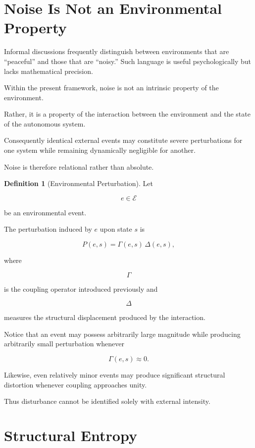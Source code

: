 \documentclass[11pt,oneside]{book}
\numberwithin{equation}{chapter}
\theoremstyle{definition}
\newtheorem{definition}{Definition}[chapter]
\theoremstyle{plain}
\begin{document}
\section{Noise Is Not an Environmental Property}

Informal discussions frequently distinguish between environments that are
``peaceful'' and those that are ``noisy.'' Such language is useful
psychologically but lacks mathematical precision.

Within the present framework, noise is not an intrinsic property of the
environment.

Rather, it is a property of the interaction between the environment and the
state of the autonomous system.

Consequently identical external events may constitute severe perturbations
for one system while remaining dynamically negligible for another.

Noise is therefore relational rather than absolute.

\begin{definition}[Environmental Perturbation]

Let

\[
e\in\mathcal{E}
\]

be an environmental event.

The perturbation induced by $e$ upon state $s$ is

\[
P(e,s)
=
\Gamma(e,s)\,
\Delta(e,s),
\]

where

\[
\Gamma
\]

is the coupling operator introduced previously and

\[
\Delta
\]

measures the structural displacement produced by the interaction.

\end{definition}

Notice that an event may possess arbitrarily large magnitude while producing
arbitrarily small perturbation whenever

\[
\Gamma(e,s)\approx0.
\]

Likewise, even relatively minor events may produce significant structural
distortion whenever coupling approaches unity.

Thus disturbance cannot be identified solely with external intensity.

\section{Structural Entropy}
\end{document}
